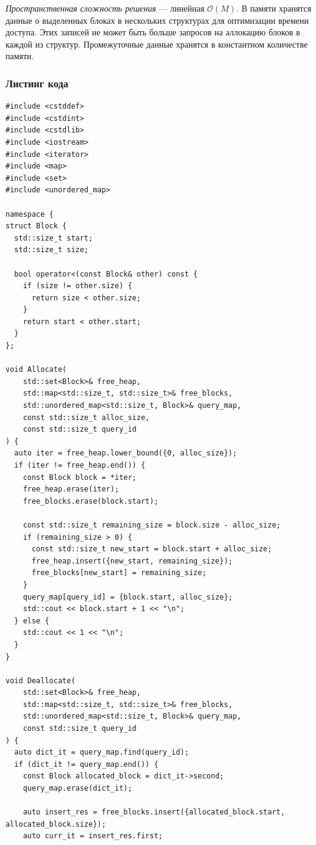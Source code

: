 \textit{Пространственная сложность решения} --- линейная \( \mathcal{O}(M) \). В памяти хранятся данные о выделенных блоках в нескольких структурах для оптимизации времени доступа. Этих записей не может быть больше запросов на аллокацию блоков в каждой из структур. Промежуточные данные хранятся в константном количестве памяти.

\subsubsection{Листинг кода}

\begin{lstlisting}
#include <cstddef>
#include <cstdint>
#include <cstdlib>
#include <iostream>
#include <iterator>
#include <map>
#include <set>
#include <unordered_map>

namespace {
struct Block {
  std::size_t start;
  std::size_t size;

  bool operator<(const Block& other) const {
    if (size != other.size) {
      return size < other.size;
    }
    return start < other.start;
  }
};

void Allocate(
    std::set<Block>& free_heap,
    std::map<std::size_t, std::size_t>& free_blocks,
    std::unordered_map<std::size_t, Block>& query_map,
    const std::size_t alloc_size,
    const std::size_t query_id
) {
  auto iter = free_heap.lower_bound({0, alloc_size});
  if (iter != free_heap.end()) {
    const Block block = *iter;
    free_heap.erase(iter);
    free_blocks.erase(block.start);

    const std::size_t remaining_size = block.size - alloc_size;
    if (remaining_size > 0) {
      const std::size_t new_start = block.start + alloc_size;
      free_heap.insert({new_start, remaining_size});
      free_blocks[new_start] = remaining_size;
    }
    query_map[query_id] = {block.start, alloc_size};
    std::cout << block.start + 1 << "\n";
  } else {
    std::cout << 1 << "\n";
  }
}

void Deallocate(
    std::set<Block>& free_heap,
    std::map<std::size_t, std::size_t>& free_blocks,
    std::unordered_map<std::size_t, Block>& query_map,
    const std::size_t query_id
) {
  auto dict_it = query_map.find(query_id);
  if (dict_it != query_map.end()) {
    const Block allocated_block = dict_it->second;
    query_map.erase(dict_it);

    auto insert_res = free_blocks.insert({allocated_block.start, allocated_block.size});
    auto curr_it = insert_res.first;


\end{lstlisting}
